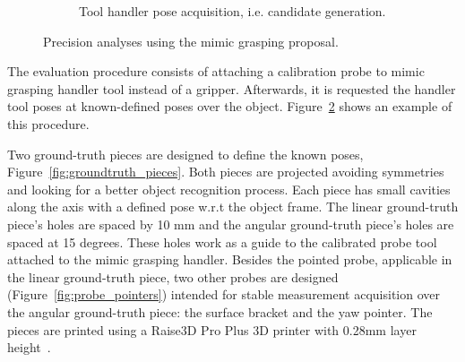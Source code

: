 \begin{figure}[h!]
{\begin{tcolorbox}
\begin{subfigure}[c]{.8\textwidth}
          \caption{Tool handler pose acquisition, i.e. candidate generation.}
          \label{fig:mimic_grasping_test_demo}
      \end{subfigure}
     \end{tcolorbox}
     \caption{Precision analyses using the mimic grasping proposal.}
     \label{fig:mimic_grapsing_procedure}
   }%
 \end{figure}


The evaluation procedure consists of attaching a calibration probe to mimic grasping handler tool instead of a gripper. Afterwards, it is requested the handler tool poses at known-defined poses over the object. Figure~\ref{fig:mimic_grapsing_procedure} shows an example of this procedure. 

Two ground-truth pieces are designed to define the known poses, Figure~\ref{fig:groundtruth_pieces}. Both pieces are projected avoiding symmetries and looking for a better object recognition process. Each piece has small cavities along the axis with a defined pose w.r.t the object frame. The linear ground-truth piece's holes are spaced by 10 mm and the angular ground-truth piece's holes are spaced at 15 degrees. These holes work as a guide to the calibrated probe tool attached to the mimic grasping handler. Besides the pointed probe, applicable in the linear ground-truth piece, two other probes are designed (Figure~\ref{fig:probe_pointers}) intended for stable measurement acquisition over the angular ground-truth piece: the surface bracket and the yaw pointer. The pieces are printed using a Raise3D Pro Plus 3D printer with 0.28mm layer height~\cite{impressora3d}.


